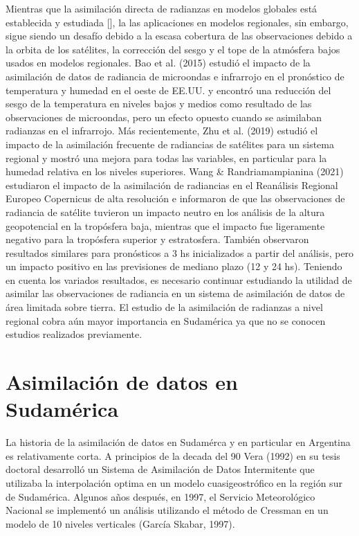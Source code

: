 \documentclass[12pt,twoside]{reedthesis}
\begin{document}
Mientras que la asimilación directa de radianzas en modelos globales está establecida y estudiada {[}{]}, la las aplicaciones en modelos regionales, sin embargo, sigue siendo un desafío debido a la escasa cobertura de las observaciones debido a la orbita de los satélites, la corrección del sesgo y el tope de la atmósfera bajos usados en modelos regionales. Bao et al. (2015) estudió el impacto de la asimilación de datos de radiancia de microondas e infrarrojo en el pronóstico de temperatura y humedad en el oeste de EE.UU. y encontró una reducción del sesgo de la temperatura en niveles bajos y medios como resultado de las observaciones de microondas, pero un efecto opuesto cuando se asimilaban radianzas en el infrarrojo. Más recientemente, Zhu et al. (2019) estudió el impacto de la asimilación frecuente de radiancias de satélites para un sistema regional y mostró una mejora para todas las variables, en particular para la humedad relativa en los niveles superiores. Wang \& Randriamampianina (2021) estudiaron el impacto de la asimilación de radiancias en el Reanálisis Regional Europeo Copernicus de alta resolución e informaron de que las observaciones de radiancia de satélite tuvieron un impacto neutro en los análisis de la altura geopotencial en la tropósfera baja, mientras que el impacto fue ligeramente negativo para la tropósfera superior y estratosfera. También observaron resultados similares para pronósticos a 3 hs inicializados a partir del análisis, pero un impacto positivo en las previsiones de mediano plazo (12 y 24 hs). Teniendo en cuenta los variados resultados, es necesario continuar estudiando la utilidad de asimilar las observaciones de radiancia en un sistema de asimilación de datos de área limitada sobre tierra. El estudio de la asimilación de radianzas a nivel regional cobra aún mayor importancia en Sudamérica ya que no se conocen estudios realizados previamente.

\hypertarget{asimilaciuxf3n-de-datos-en-sudamuxe9rica}{%
\section{Asimilación de datos en Sudamérica}\label{asimilaciuxf3n-de-datos-en-sudamuxe9rica}}

La historia de la asimilación de datos en Sudamérca y en particular en Argentina es relativamente corta. A principios de la decada del 90 Vera (1992) en su tesis doctoral desarrolló un Sistema de Asimilación de Datos Intermitente que utilizaba la interpolación optima en un modelo cuasigeostrófico en la región sur de Sudamérica. Algunos años después, en 1997, el Servicio Meteorológico Nacional se implementó un
análisis utilizando el método de Cressman en un modelo de 10 niveles verticales (García Skabar, 1997).
\end{document}
